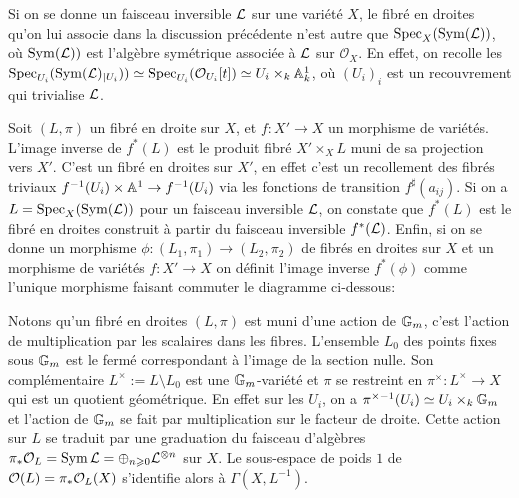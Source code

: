 \begin{rem}
Si on se donne un faisceau inversible $\mathcal{L}$ sur une variété $X$, le fibré en droites qu'on lui associe dans la discussion précédente n'est autre que $\operatorname{Spec}_X(\operatorname{Sym}(\mathcal{L}))$, où $\operatorname{Sym}(\mathcal{L}))$ est l'algèbre symétrique associée à $\mathcal{L}$ sur $\mathcal{O}_X$. En effet, on recolle les $\operatorname{Spec}_{U_i}(\operatorname{Sym}(\mathcal{L})_{|U_i}))\simeq\operatorname{Spec}_{U_i}( \mathcal{O}_{U_i}[t])\simeq U_i \times_k \mathbb{A}^1_k$, où $(U_i)_i$ est un recouvrement qui trivialise $\mathcal{L}$.
\end{rem}

Soit $(L,\pi)$ un fibré en droite sur $X$, et $f:X'\rightarrow X$ un morphisme de variétés. L'image inverse de $f^*(L)$ est le produit fibré $X'\times_X L$ muni de sa projection vers $X'$. C'est un fibré en droites sur $X'$, en effet c'est un recollement des fibrés triviaux $f^{-1}(U_i)\times \mathbb{A}^1\rightarrow f^{-1}(U_i)$ via les fonctions de transition $f^\sharp(a_{ij})$. Si on a $L=\operatorname{Spec}_X(\operatorname{Sym}(\mathcal{L}))$ pour un faisceau inversible $\mathcal{L}$, on constate que $f^*(L)$ est le fibré en droites construit à partir du faisceau inversible $f^*(\mathcal{L})$. Enfin, si on se donne un morphisme $\phi:(L_1,\pi_1)\rightarrow (L_2,\pi_2)$ de fibrés en droites sur $X$ et un morphisme de variétés $f:X'\rightarrow X$ on définit l'image inverse $f^*(\phi)$ comme l'unique morphisme faisant commuter le diagramme ci-dessous:

	\begin{center}
	\end{center}

\begin{rem}\label{remfibsectionsglobales}
Notons qu'un fibré en droites $(L, \pi)$ est muni d'une action de $\mathbb{G}_m$, c'est l'action de multiplication par les scalaires dans les fibres. L'ensemble $L_0$ des points fixes sous $\mathbb{G}_m$ est le fermé correspondant à l'image de la section nulle. Son complémentaire $L^\times:=L\setminus L_0$ est une $\mathbb{G}_m$-variété et $\pi$ se restreint en $\pi^\times: L^\times \rightarrow X$ qui est un quotient géométrique. En effet sur les $U_i$, on a $\pi^{\times-1}(U_i) \simeq U_i\times_k \mathbb{G}_m$ et l'action de $\mathbb{G}_m$ se fait par multiplication sur le facteur de droite. Cette action sur $L$  se traduit par une graduation du faisceau d'algèbres $\pi_*\mathcal{O}_L=\operatorname{Sym}\mathcal{L}=\oplus_{n\geqslant 0}\mathcal{L}^{\otimes n}$ sur $X$. Le sous-espace de poids $1$ de $\mathcal{O}(L)=\pi_*\mathcal{O}_L(X)$ s'identifie alors à $\Gamma(X,L^{-1})$.
\end{rem}

